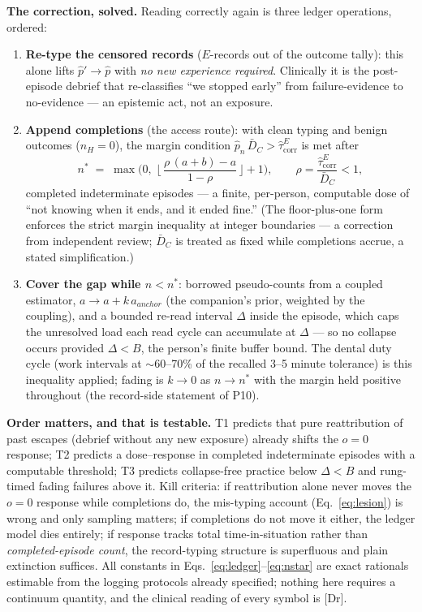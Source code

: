 \documentclass[9pt,twocolumn]{article}
\newcommand{\tcorr}{\widehat{\tau}^{E}_{\mathrm{corr}}}
\newcommand{\tier}[1]{{\sffamily\scriptsize\color{RRHMSlate}[#1]}}
\begin{document}
\textbf{The correction, solved.} Reading correctly again is three ledger operations, ordered:
\begin{enumerate}[leftmargin=1.7em]
\item[T1] \textbf{Re-type the censored records} ($E$-records out of the outcome tally): this alone lifts $\hat p'\to\hat p$ with \emph{no new experience required}. Clinically it is the post-episode debrief that re-classifies ``we stopped early'' from failure-evidence to no-evidence --- an epistemic act, not an exposure.
\item[T2] \textbf{Append completions} (the access route): with clean typing and benign outcomes ($n_H{=}0$), the margin condition $\hat p_n\,\bar D_C>\tcorr$ is met after
\begin{equation}
n^{*}\;=\;\max\Big(0,\;\Big\lfloor\,\frac{\rho\,(a+b)-a}{1-\rho}\,\Big\rfloor+1\Big),\qquad \rho=\frac{\tcorr}{\bar D_C}<1,
\label{eq:nstar}
\end{equation}
completed indeterminate episodes --- a finite, per-person, computable dose of ``not knowing when it ends, and it ended fine.'' (The floor-plus-one form enforces the strict margin inequality at integer boundaries --- a correction from independent review; $\bar D_C$ is treated as fixed while completions accrue, a stated simplification.)
\item[T3] \textbf{Cover the gap while $n<n^{*}$}: borrowed pseudo-counts from a coupled estimator, $a\to a+k\,a_{anchor}$ (the companion's prior, weighted by the coupling), and a bounded re-read interval $\Delta$ inside the episode, which caps the unresolved load each read cycle can accumulate at $\Delta$ --- so no collapse occurs provided $\Delta<B$, the person's finite buffer bound. The dental duty cycle (work intervals at $\sim$60--70\% of the recalled 3--5 minute tolerance) is this inequality applied; fading is $k\to0$ as $n\to n^{*}$ with the margin held positive throughout (the record-side statement of P10).
\end{enumerate}

\textbf{Order matters, and that is testable.} T1 predicts that pure reattribution of past escapes (debrief without any new exposure) already shifts the $o{=}0$ response; T2 predicts a dose--response in completed indeterminate episodes with a computable threshold; T3 predicts collapse-free practice below $\Delta<B$ and rung-timed fading failures above it. Kill criteria: if reattribution alone never moves the $o{=}0$ response while completions do, the mis-typing account (Eq.~\ref{eq:lesion}) is wrong and only sampling matters; if completions do not move it either, the ledger model dies entirely; if response tracks total time-in-situation rather than \emph{completed-episode count}, the record-typing structure is superfluous and plain extinction suffices. All constants in Eqs.~\ref{eq:ledger}--\ref{eq:nstar} are exact rationals estimable from the logging protocols already specified; nothing here requires a continuum quantity, and the clinical reading of every symbol is \tier{Dr}.
\end{document}
